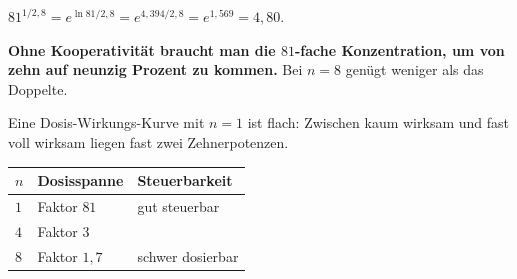 \begin{aufgabe}
 $81^{1/2{,}8} = e^{\ln81/2{,}8} = e^{4{,}394/2{,}8} = e^{1{,}569} = 4{,}80$.

\begin{center}
\begin{minipage}{0.9\textwidth}
\textbf{Ohne Kooperativität braucht man die $81$-fache Konzentration, um von zehn auf neunzig Prozent zu kommen.} Bei $n=8$ genügt weniger als das Doppelte.
\end{minipage}
\end{center}

Eine Dosis-Wirkungs-Kurve mit $n=1$ ist flach: Zwischen kaum wirksam und fast voll wirksam liegen fast zwei Zehnerpotenzen.

\begin{center}
\renewcommand{\arraystretch}{1.48}
\begin{tabular}{@{}P{2.0cm}P{3.0cm}P{2.6cm}@{}}
\toprule
$n$ & \textbf{Dosisspanne} & \textbf{Steuerbarkeit}\\
\midrule
$1$ & Faktor $81$ & \textcolor{gruen}{gut steuerbar}\\
$4$ & Faktor $3$ & \\
$8$ & Faktor $1{,}7$ & \textcolor{akzent}{schwer dosierbar}\\
\bottomrule
\end{tabular}
\end{center}

\begin{center}
\begin{minipage}{0.88\textwidth}
\end{minipage}
\end{center}
\end{aufgabe}

